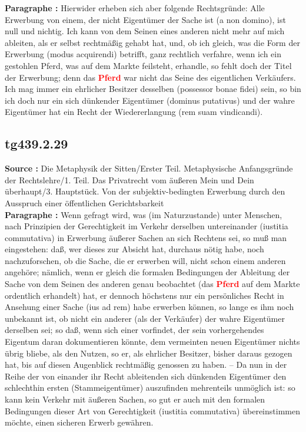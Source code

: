 \documentclass[a4paper,12pt,twoside]{book}
\newcommand{\match}[1]{\textcolor{red}{\textbf{#1}}}
\begin{document}
	\textbf{Paragraphe : }
	Hierwider erheben sich aber folgende Rechtsgründe: Alle Erwerbung von einem, der nicht Eigentümer der Sache ist (a non domino), ist null und nichtig. Ich kann von dem Seinen eines anderen nicht mehr auf mich ableiten, als er selbst rechtmäßig gehabt hat, und, ob ich gleich, was die Form der Erwerbung (modus acquirendi) betrifft, ganz rechtlich verfahre, wenn ich ein gestohlen Pferd, was auf dem Markte feilsteht, erhandle, so fehlt doch der Titel der Erwerbung; denn das \match{Pferd} war nicht das Seine des eigentlichen Verkäufers. Ich mag immer ein ehrlicher Besitzer desselben (possessor bonae fidei) sein, so bin ich doch nur ein sich dünkender Eigentümer (dominus putativus) und der wahre Eigentümer hat ein Recht der Wiedererlangung (rem suam vindicandi). 
	
	\subsection*{tg439.2.29} 
	\textbf{Source : }Die Metaphysik der Sitten/Erster Teil. Metaphysische Anfangsgründe der Rechtslehre/1. Teil. Das Privatrecht vom äußeren Mein und Dein überhaupt/3. Hauptstück. Von der subjektiv-bedingten Erwerbung durch den Ausspruch einer öffentlichen Gerichtsbarkeit\\  
	
	\textbf{Paragraphe : }Wenn gefragt wird, was (im Naturzustande) unter Menschen, nach Prinzipien der Gerechtigkeit im Verkehr derselben untereinander (iustitia commutativa) in Erwerbung äußerer Sachen an sich Rechtens sei, so muß man eingestehen: daß, wer dieses zur Absicht hat, durchaus nötig habe, noch nachzuforschen, ob die Sache, die er erwerben will, nicht schon einem anderen angehöre; nämlich, wenn er gleich die formalen Bedingungen der Ableitung der Sache von dem Seinen des anderen genau beobachtet (das \match{Pferd} auf dem Markte ordentlich erhandelt) hat, er dennoch höchstens nur ein persönliches Recht in Ansehung einer Sache (ius ad rem) habe erwerben können, so lange es ihm noch unbekannt ist, ob nicht ein anderer (als der Verkäufer) der wahre Eigentümer derselben sei; so daß, wenn sich einer vorfindet, der sein vorhergehendes Eigentum daran dokumentieren könnte, dem vermeinten neuen Eigentümer nichts übrig bliebe, als den Nutzen, so er, als ehrlicher Besitzer, bisher daraus gezogen hat, bis auf diesen Augenblick rechtmäßig genossen zu haben. – Da nun in der Reihe der von einander ihr Recht ableitenden sich dünkenden Eigentümer den schlechthin ersten (Stammeigentümer) auszufinden mehrenteils unmöglich ist: so kann kein Verkehr mit äußeren Sachen, so gut er auch mit den formalen Bedingungen dieser Art von Gerechtigkeit (iustitia  commutativa) übereinstimmen möchte, einen sicheren Erwerb gewähren. 
	
\end{document}
